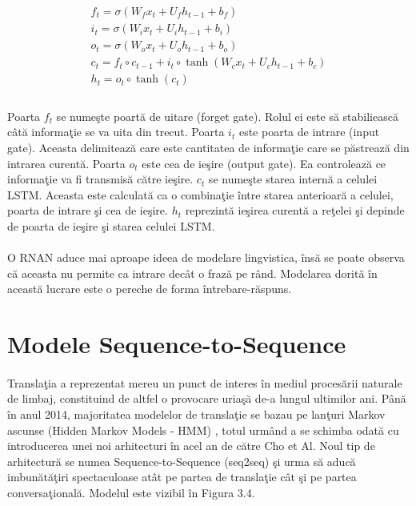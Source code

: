 \begin{equation}
\begin{split}
f_{t} = \sigma(W_{f}x_{t} + U_{f}h_{t-1} + b_{f})\\
i_{t} = \sigma(W_{i}x_{t} + U_{i}h_{t-1} + b_{i})\\
o_{t} = \sigma(W_{o}x_{t} + U_{o}h_{t-1} + b_{o})\\
c_{t} = f_{t} \circ c_{t-1} + i_{t} \circ \tanh (W_{c}x_{t} + U_{c}h_{t-1} + b_{c})\\
h_{t} = o_{t} \circ \tanh (c_{t})\\
\end{split}
\end{equation}

\paragraph{}
Poarta \(f_{t}\) se nume\c ste poart\u a de uitare (forget gate). Rolul ei este s\u a stabilieasc\u a c\^ at\u a informa\c tie se va uita din trecut. Poarta \(i_{t}\) este poarta de intrare (input gate). Aceasta delimiteaz\u a care este cantitatea de informa\c tie care se p\u astreaz\u a din intrarea curent\u a. Poarta \(o_{t}\) este cea de ie\c sire (output gate). Ea controleaz\u a ce informa\c tie va fi transmis\u a c\u atre ie\c sire. \(c_{t}\) se nume\c ste starea intern\u a a celulei LSTM. Aceasta este calculat\u a ca o combina\c tie \^ intre starea anterioar\u a a celulei, poarta de intrare \c si cea de ie\c sire. \(h_{t}\) reprezint\u a ie\c sirea curent\u a a re\c telei \c si depinde de poarta de ie\c sire \c si starea celulei LSTM. 

\paragraph{}
O RNAN aduce mai aproape ideea de modelare lingvistica, \^ ins\u a se poate observa c\u a aceasta nu permite ca intrare dec\^ at o fraz\u a pe r\^ and. Modelarea dorit\u a \^ in aceast\u a lucrare este o pereche de forma \^ intrebare-r\u aspuns.

\section{Modele Sequence-to-Sequence}

\paragraph{}
Transla\c tia a reprezentat mereu un punct de interes \^ in mediul proces\u arii naturale de limbaj, constituind de altfel o provocare uria\c s\u a de-a lungul ultimilor ani. P\^ an\u a \^ in anul 2014, majoritatea modelelor de transla\c tie se bazau pe lan\c turi Markov ascunse (Hidden Markov Models - HMM) \cite{Rabiner:1990:THM:108235.108253}, totul urm\^ and a se schimba odat\u a cu introducerea unei noi arhitecturi \^ in acel an de c\u atre Cho et Al. Noul tip de arhitectur\u a se numea Sequence-to-Sequence (seq2seq) \cite{DBLP:journals/corr/SutskeverVL14} \c si urma s\u a aduc\u a imbun\u at\u a\c tiri spectaculoase at\^ at pe partea de transla\c tie c\^ at \c si pe partea conversa\c tional\u a. Modelul este vizibil \^ in Figura 3.4.

